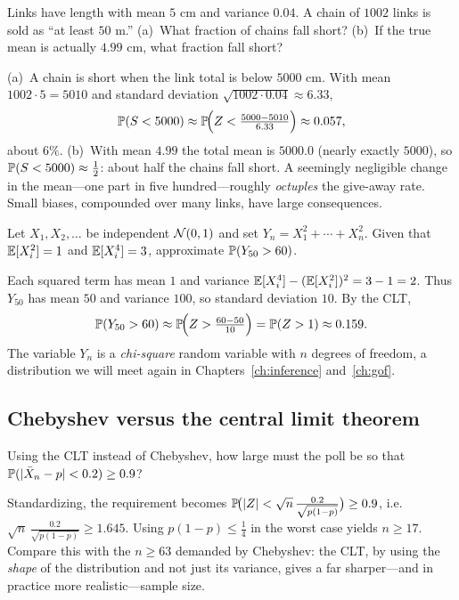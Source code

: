 \begin{example}
Links have length with mean $5$ cm and variance $0.04$. A chain of $1002$ links
is sold as ``at least $50$ m.'' (a)~What fraction of chains fall short?
(b)~If the true mean is actually $4.99$ cm, what fraction fall short?

\solution (a)~A chain is short when the link total is below $5000$ cm. With mean
$1002\cdot 5=5010$ and standard deviation $\sqrt{1002\cdot 0.04}\approx 6.33$,
\[
  \mathbb{P}(S<5000)\approx\mathbb{P}\!\Bigl(Z<\tfrac{5000-5010}{6.33}\Bigr)\approx 0.057,
\]
about $6\%$. (b)~With mean $4.99$ the total mean is $5000.0$ (nearly exactly
$5000$), so $\mathbb{P}(S<5000)\approx\tfrac12$: about half the chains fall short.
A seemingly negligible change in the mean—one part in five hundred—roughly
\emph{octuples} the give-away rate. Small biases, compounded over many links,
have large consequences.
\end{example}

\begin{example}
Let $X_1,X_2,\dots$ be independent $\mathcal{N}(0,1)$ and set $Y_n=X_1^2+\cdots+X_n^2$.
Given that $\mathbb{E}[X_i^2]=1$ and $\mathbb{E}[X_i^4]=3$, approximate $\mathbb{P}(Y_{50}>60)$.

\solution Each squared term has mean $1$ and variance
$\mathbb{E}[X_i^4]-(\mathbb{E}[X_i^2])^2=3-1=2$. Thus $Y_{50}$ has mean $50$ and variance
$100$, so standard deviation $10$. By the CLT,
\[
  \mathbb{P}(Y_{50}>60)\approx\mathbb{P}\!\Bigl(Z>\tfrac{60-50}{10}\Bigr)=\mathbb{P}(Z>1)\approx 0.159.
\]
The variable $Y_n$ is a \emph{chi-square} random variable with $n$ degrees of
freedom, a distribution we will meet again in
Chapters~\ref{ch:inference} and~\ref{ch:gof}.
\end{example}

\subsection{Chebyshev versus the central limit theorem}

\begin{example}
Using the CLT instead of Chebyshev, how large must the poll be so that
$\mathbb{P}(|\bar{X}_n-p|<0.2)\ge 0.9$?

\solution Standardizing, the requirement becomes
$\mathbb{P}\!\bigl(|Z|<\sqrt n\,\tfrac{0.2}{\sqrt{p(1-p)}}\bigr)\ge 0.9$, i.e.\
$\sqrt n\,\tfrac{0.2}{\sqrt{p(1-p)}}\ge 1.645$. Using $p(1-p)\le\tfrac14$ in the
worst case yields $n\ge 17$. Compare this with the $n\ge 63$ demanded by
Chebyshev: the CLT, by using the \emph{shape} of the distribution and not just
its variance, gives a far sharper—and in practice more realistic—sample size.
\end{example}
